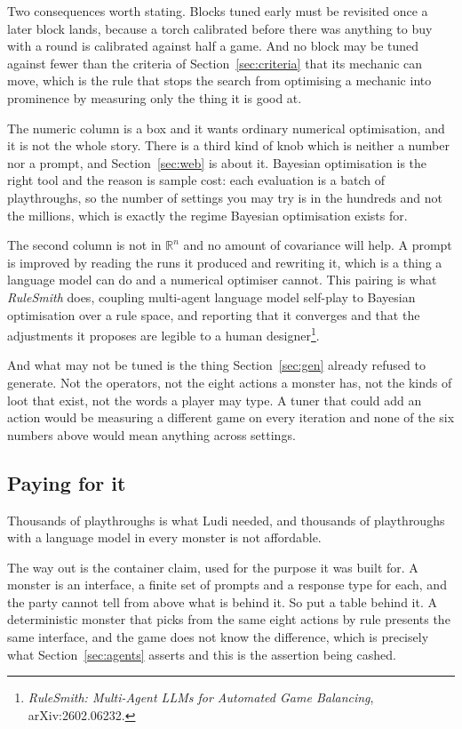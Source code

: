 \documentclass[11pt,a4paper]{article}
\begin{document}
Two consequences worth stating. Blocks tuned early must be revisited once a later block lands,
because a torch calibrated before there was anything to buy with a round is calibrated against
half a game. And no block may be tuned against fewer than the criteria of
Section~\ref{sec:criteria} that its mechanic can move, which is the rule that stops the search from
optimising a mechanic into prominence by measuring only the thing it is good at.

The numeric column is a box and it wants ordinary numerical optimisation, and it is not the whole
story. There is a third kind of knob which is neither a number nor a prompt, and
Section~\ref{sec:web} is about it. Bayesian optimisation is the right tool and the reason is sample cost: each
evaluation is a batch of playthroughs, so the number of settings you may try is in the hundreds
and not the millions, which is exactly the regime Bayesian optimisation exists for.

The second column is not in $\mathbb{R}^n$ and no amount of covariance will help. A prompt is
improved by reading the runs it produced and rewriting it, which is a thing a language model can
do and a numerical optimiser cannot. This pairing is what \emph{RuleSmith} does, coupling
multi-agent language model self-play to Bayesian optimisation over a rule space, and reporting
that it converges and that the adjustments it proposes are legible to a human
designer\footnote{\emph{RuleSmith: Multi-Agent LLMs for Automated Game Balancing}, arXiv:2602.06232.}.

\begin{alarmbox}
And what may not be tuned is the thing Section~\ref{sec:gen} already refused to generate. Not the
operators, not the eight actions a monster has, not the kinds of loot that exist, not the words a
player may type. A tuner that could add an action would be measuring a different game on every
iteration and none of the six numbers above would mean anything across settings.
\end{alarmbox}

\subsection{Paying for it}
\label{sec:paying}
\label{sec:cost}

Thousands of playthroughs is what Ludi needed, and thousands of playthroughs with a language
model in every monster is not affordable.

The way out is the container claim, used for the purpose it was built for. A monster is an
interface, a finite set of prompts and a response type for each, and the party cannot tell from
above what is behind it. So put a table behind it. A deterministic monster that picks from the
same eight actions by rule presents the same interface, and the game does not know the difference,
which is precisely what Section~\ref{sec:agents} asserts and this is the assertion being cashed.
\end{document}
